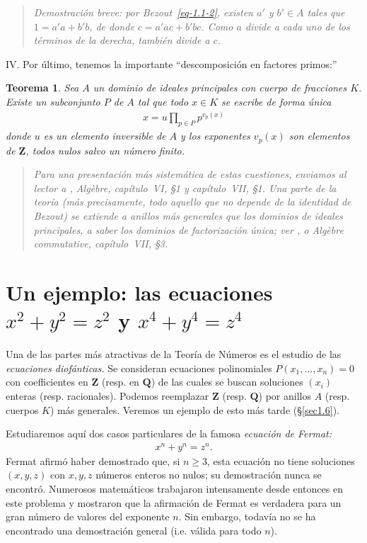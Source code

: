 \documentclass[bibtotoc,leqno,spanish]{amsbook}
\newcommand{\QQ}{\mathbf{Q}}
\newcommand{\ZZ}{\mathbf{Z}}
\numberwithin{equation}{section}
\newenvironment{comm}%
	{\begin{quotation}\itshape}
	{\end{quotation}}
\theoremstyle{note}
\theoremstyle{note}
\newtheorem*{theorem*}{Teorema}
\theoremstyle{rem}
\numberwithin{theorem}{section}
\numberwithin{proposition}{section}
\numberwithin{definition}{section}
\numberwithin{lemma}{section}
\numberwithin{corollary}{section}
\numberwithin{example}{section}
\numberwithin{footnote}{section}%
\begin{document}
\begin{trivlist}
\begin{comm}
Demostraci\'on breve: por Bezout~\eqref{eq-1.1-2}, existen $a'$ y $b'\in A$
tales que $1 = a'a+b'b$, de donde $c = a'ac+b'bc$. Como $a$ divide a cada uno de los
t\'erminos de la derecha, tambi\'en divide a $c$.
\end{comm}

\item {IV.} Por \'ultimo, tenemos la importante ``descomposici\'on en factores primos:''
\begin{theorem*}
Sea $A$ un dominio de ideales principales con cuerpo de fracciones $K$. Existe
un subconjunto $P$ de $A$ tal que todo $x\in K$ se escribe de forma \'unica
\begin{gather}
x = u\prod_{p\in P}p^{v_{p}(x)}
\end{gather}
donde $u$ es un elemento inversible de $A$ y los exponentes $v_{p}(x)$ son
elementos de $\ZZ$, todos nulos salvo un n\'umero finito.
\end{theorem*}
\end{trivlist}

\begin{comm}
Para una presentaci\'on m\'as sistem\'atica de estas cuestiones, enviamos al lector
a \cite{Bourbaki1}, {\itshape Alg\`ebre,} cap\'itulo~VI, \S1 y cap\'itulo~VII, \S1.
Una parte de la teor\'ia (m\'as precisamente, todo aquello que no depende de la identidad de Bezout)
se extiende a anillos m\'as generales que los dominios de ideales principales, a saber
los {\em dominios de factorizaci\'on \'unica;} ver \cite{Samuel2}, o \cite{Bourbaki2} Alg\`ebre
commutative, cap\'itulo~VII, \S3.
\end{comm}

\section{Un ejemplo: las ecuaciones $x^{2}+y^{2}=z^{2}$ y $x^{4}+y^{4}=z^{4}$}\label{sec1.2}

Una de las partes m\'as atractivas de la Teor\'ia de N\'umeros es el estudio de
las {\em ecuaciones diof\'anticas.} Se consideran ecuaciones polinomiales
$P(x_{1},\dots,x_{n}) = 0$ con coefficientes en $\ZZ$ (resp. en $\QQ$) de las cuales
se buscan soluciones $(x_{i})$ enteras (resp. racionales). Podemos reemplazar $\ZZ$
(resp. $\QQ$) por anillos $A$ (resp. cuerpos $K$) m\'as generales. Veremos un
ejemplo de esto m\'as tarde (\S\ref{sec1.6}).

Estudiaremos aqu\'i dos casos particulares de la famosa {\em ecuaci\'on de Fermat:}
\begin{gather}\label{eq-1.2-1}
x^{n}+y^{n} = z^{n}.
\end{gather}
Fermat afirm\'o haber demostrado que, si $n\geq 3$, esta ecuaci\'on no tiene soluciones
$(x,y,z)$ con $x,y,z$ n\'umeros enteros no nulos; su demostraci\'on nunca se encontr\'o.
Numerosos matem\'aticos trabajaron intensamente desde entonces en este problema y mostraron
que la afirmaci\'on de Fermat es verdadera para un gran n\'umero de valores del exponente $n$.
Sin embargo, todav\'ia no se ha encontrado una demostraci\'on general (i.e. v\'alida para
todo $n$).
\end{document}
